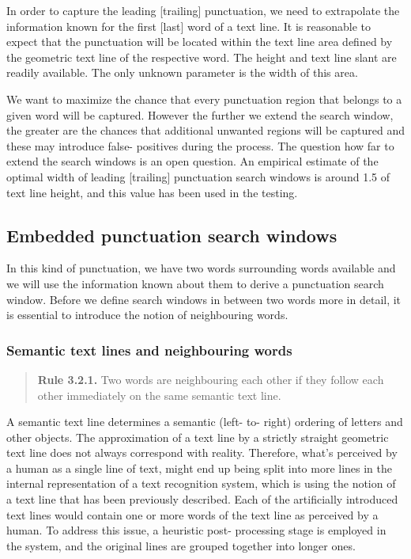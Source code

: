 \documentclass[12pt,a4paper]{report}
\begin{document}
In order to capture the leading [trailing] punctuation, we need to extrapolate the information known for the first [last] word of a text line. It is reasonable to expect that the punctuation will be located within the text line area defined by the geometric text line of the respective word. The height and text line slant are readily available. The only unknown parameter is the width of this area.

We want to maximize the chance that every punctuation region that belongs to a given word will be captured. However the further we extend the search window, the greater are the chances that additional unwanted regions will be captured and these may introduce false- positives during the process. The question how far to extend the search windows is an open question. An empirical estimate of the optimal width of leading [trailing] punctuation search windows is around 1.5 of text line height, and this value has been used in the testing.

\subsection{Embedded punctuation search windows}
In this kind of punctuation, we have two words surrounding words available and we will use the information known about them to derive a punctuation search window. Before we define search windows in between two words more in detail, it is essential to introduce the notion of neighbouring words.

\subsubsection{Semantic text lines and neighbouring words}
\begin{quote}
\textbf{Rule 3.2.1.} Two words are neighbouring each other if they follow each other immediately on the same semantic text line.
\end{quote}

A semantic text line determines a semantic (left- to- right) ordering of letters and other objects. The approximation of a text line by a strictly straight geometric text line does not always correspond with reality. Therefore, what's perceived by a human as a single line of text, might end up being split into more lines in the internal representation of a text recognition system, which is using the notion of a text line that has been previously described. Each of the artificially introduced text lines would contain one or more words of the text line as perceived by a human. To address this issue, a heuristic post- processing stage is employed in the system, and the original lines are grouped together into longer ones.
\end{document}
